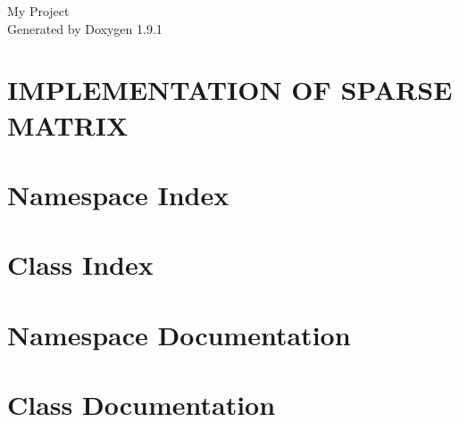 \let\mypdfximage\pdfximage\def\pdfximage{\immediate\mypdfximage}\documentclass[twoside]{book}
\newcommand{\+}{\discretionary{\mbox{\scriptsize$\hookleftarrow$}}{}{}}
\newcommand{\clearemptydoublepage}{%
  \newpage{\pagestyle{empty}\cleardoublepage}%
}
\begin{document}
\raggedbottom

\hypersetup{pageanchor=false,
             bookmarksnumbered=true,
             pdfencoding=unicode
            }
\begin{titlepage}
\vspace*{7cm}
\begin{center}%
{\Large My Project }\\
\vspace*{1cm}
{\large Generated by Doxygen 1.9.1}\\
\end{center}
\end{titlepage}
\clearemptydoublepage
{}
\tableofcontents
\clearemptydoublepage
{}
\hypersetup{pageanchor=true}

\chapter{IMPLEMENTATION OF SPARSE MATRIX}
\label{md_README}

\chapter{Namespace Index}

\chapter{Class Index}

\chapter{Namespace Documentation}

\chapter{Class Documentation}



\backmatter
\newpage
{}
\clearemptydoublepage
{}
\printindex
\end{document}
